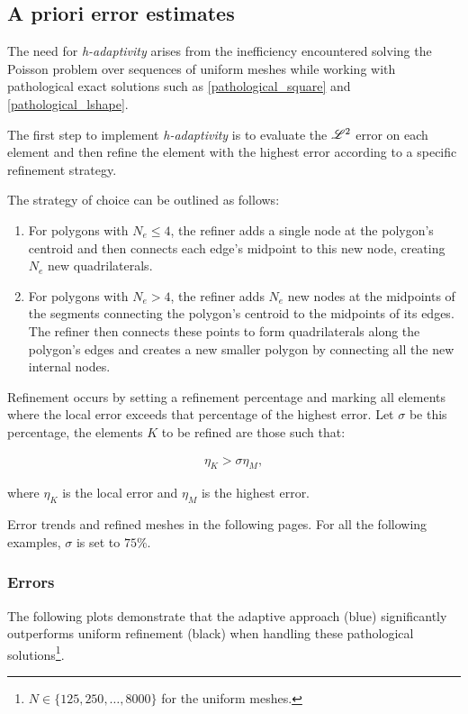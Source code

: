 \subsection{A priori error estimates}

The need for \textit{h-adaptivity} arises from the inefficiency encountered solving the Poisson problem over sequences of uniform meshes while working with pathological exact solutions such as \eqref{pathological_square} and \eqref{pathological_lshape}.

The first step to implement \textit{h-adaptivity} is to evaluate the $\mathscr{L}^2$ error on each element and then refine the element with the highest error according to a specific refinement strategy.

The strategy of choice can be outlined as follows:

\begin{enumerate}
    \item For polygons with $N_e \leq 4$, the refiner adds a single node at the polygon's centroid and then connects each edge's midpoint to this new node, creating $N_e$ new quadrilaterals.
    \item For polygons with $N_e > 4$, the refiner adds $N_e$ new nodes at the midpoints of the segments connecting the polygon's centroid to the midpoints of its edges. The refiner then connects these points to form quadrilaterals along the polygon's edges and creates a new smaller polygon by connecting all the new internal nodes.
\end{enumerate}

Refinement occurs by setting a refinement percentage and marking all elements where the local error exceeds that percentage of the highest error. Let $\sigma$ be this percentage, the elements $K$ to be refined are those such that:

\begin{gather}
	\eta_K > \sigma \eta_{M},
\end{gather}

where $\eta_K$ is the local error and $\eta_M$ is the highest error.

Error trends and refined meshes in the following pages. For all the following examples, $\sigma$ is set to $75\%$.

\newpage
\subsubsection{Errors}

The following plots demonstrate that the adaptive approach (blue) significantly outperforms uniform refinement (black) when handling these pathological solutions\footnote{$N \in \{125, 250, \dots, 8000\}$ for the uniform meshes.}.

